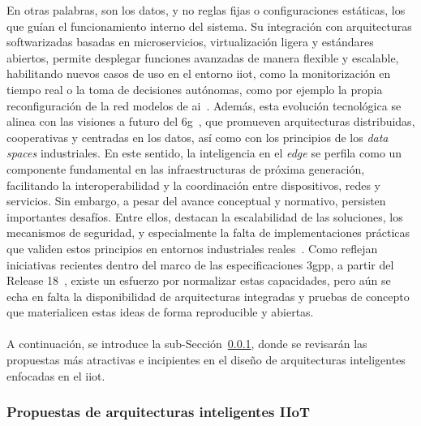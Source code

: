 En otras palabras, son los datos, y no reglas fijas o configuraciones estáticas, los que guían el funcionamiento interno del sistema. Su integración con arquitecturas softwarizadas basadas en microservicios, virtualización ligera y estándares abiertos, permite desplegar funciones avanzadas de manera flexible y escalable, habilitando nuevos casos de uso en el entorno \gls{iiot}, como la monitorización en tiempo real o la toma de decisiones autónomas, como por ejemplo la propia reconfiguración de la red modelos de \gls{ai}~\cite{rojas2024towards}. Además, esta evolución tecnológica se alinea con las visiones a futuro del \gls{6g}~\cite{uusitalo20216g,jiang2021road}, que promueven arquitecturas distribuidas, cooperativas y centradas en los datos, así como con los principios de los \textit{data spaces} industriales. En este sentido, la inteligencia en el \textit{edge} se perfila como un componente fundamental en las infraestructuras de próxima generación, facilitando la interoperabilidad y la coordinación entre dispositivos, redes y servicios. Sin embargo, a pesar del avance conceptual y normativo, persisten importantes desafíos. Entre ellos, destacan la escalabilidad de las soluciones, los mecanismos de seguridad, y especialmente la falta de implementaciones prácticas que validen estos principios en entornos industriales reales~\cite{onate2023analysis}. Como reflejan iniciativas recientes dentro del marco de las especificaciones \gls{3gpp}, a partir del Release 18~\cite{lin2022overview}, existe un esfuerzo por normalizar estas capacidades, pero aún se echa en falta la disponibilidad de arquitecturas integradas y pruebas de concepto que materialicen estas ideas de forma reproducible y abiertas.\\
\\
A continuación, se introduce la sub-Sección~\ref{subsubsec:propuestas_iiot}, donde se revisarán las propuestas más atractivas e incipientes en el diseño de arquitecturas inteligentes enfocadas en el \gls{iiot}.

\subsubsection{Propuestas de arquitecturas inteligentes IIoT}
\label{subsubsec:propuestas_iiot}

